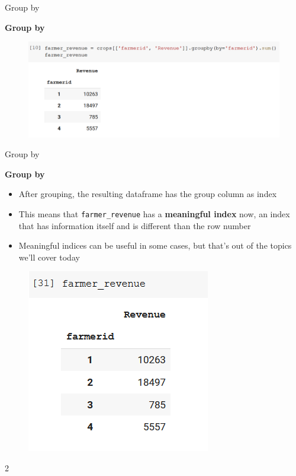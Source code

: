 \documentclass[aspectratio=169]{beamer}
\begin{document}
\begin{frame}{Group by}

	\textbf{Group by}

	\begin{figure}
		\centering
		\includegraphics[width=\linewidth]{img/groupby.png}
	\end{figure}

\end{frame}

\begin{frame}{Group by}

	\textbf{Group by}

	\begin{multicols}{2}
		\begin{itemize}
			\item After grouping, the resulting dataframe has the group column as index
			\item This means that \texttt{farmer\_revenue} has a \textbf{meaningful index} now, an index that has information itself and is different than the row number
			\item Meaningful indices can be useful in some cases, but that's out of the topics we'll cover today
		\end{itemize}
		\begin{figure}
			\centering
			\includegraphics[width=0.8\linewidth]{img/farmer_revenue.png}
		\end{figure}
	\end{multicols}{2}

\end{frame}
\end{document}
